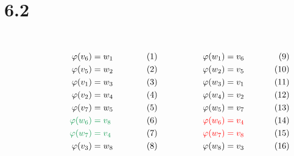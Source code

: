 \documentclass[12pt]{article}
\begin{document}
\section*{6.2}
\[
	\begin{minipage}[t]{0.45\textwidth}
		\begin{align*}
			\varphi(v_6)                          & = w_1                            \\
			\varphi(v_5)                          & = w_2                            \\
			\varphi(v_1)                          & = w_3                            \\
			\varphi(v_2)                          & = w_4                            \\
			\varphi(v_7)                          & = w_5                            \\
			\textcolor{ForestGreen}{\varphi(w_6)} & \;\textcolor{ForestGreen}{= v_8} \\
			\textcolor{ForestGreen}{\varphi(w_7)} & \;\textcolor{ForestGreen}{= v_4} \\
			\varphi(v_3)                          & = w_8
		\end{align*}
	\end{minipage}%
	\begin{minipage}[t]{0.45\textwidth}
		\begin{align*}
			\varphi(w_1)                  & = v_6                    \\
			\varphi(w_2)                  & = v_5                    \\
			\varphi(w_3)                  & = v_1                    \\
			\varphi(w_4)                  & = v_2                    \\
			\varphi(w_5)                  & = v_7                    \\
			\textcolor{red}{\varphi(w_6)} & \;\textcolor{red}{= v_4} \\
			\textcolor{red}{\varphi(w_7)} & \;\textcolor{red}{= v_8} \\
			\varphi(w_8)                  & = v_3
		\end{align*}
	\end{minipage}
\]
\end{document}
